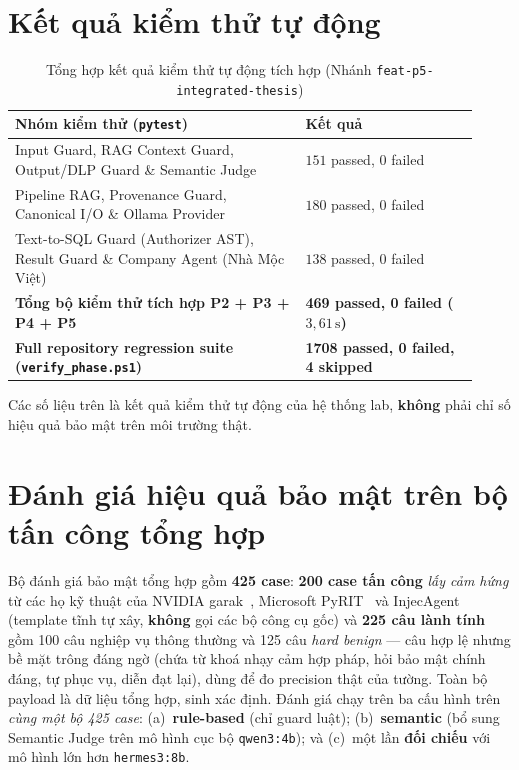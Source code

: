 \section{Kết quả kiểm thử tự động}

\begin{table}[!htbp]
\centering
\caption{Tổng hợp kết quả kiểm thử tự động tích hợp (Nhánh \texttt{feat-\allowbreak p5-\allowbreak integrated-\allowbreak thesis})}
\label{tab:test-summary}
\begin{tabular}{@{}L{0.58\linewidth}L{0.34\linewidth}@{}}
\toprule
\textbf{Nhóm kiểm thử (\texttt{pytest})} & \textbf{Kết quả} \\
\midrule
Input Guard, RAG Context Guard, Output/DLP Guard \& Semantic Judge & $151$ passed, $0$ failed \\
Pipeline RAG, Provenance Guard, Canonical I/O \& Ollama Provider & $180$ passed, $0$ failed \\
Text-to-SQL Guard (Authorizer AST), Result Guard \& Company Agent (Nhà Mộc Việt) & $138$ passed, $0$ failed \\
\textbf{Tổng bộ kiểm thử tích hợp P2 + P3 + P4 + P5} & \textbf{469 passed, 0 failed ($3{,}61\,\text{s}$)} \\
\textbf{Full repository regression suite (\texttt{verify\_\allowbreak phase.\allowbreak ps1})} & \textbf{1708 passed, 0 failed, 4 skipped} \\
\bottomrule
\end{tabular}
\end{table}

Các số liệu trên là kết quả kiểm thử tự động của hệ thống lab, \textbf{không} phải chỉ số hiệu quả bảo mật trên môi trường thật.

\section{Đánh giá hiệu quả bảo mật trên bộ tấn công tổng hợp}
\label{sec:sec-eval}

Bộ đánh giá bảo mật tổng hợp gồm \textbf{425 case}: \textbf{200 case tấn công}
\emph{lấy cảm hứng} từ các họ kỹ thuật của NVIDIA garak~\cite{derczynski2024garak},
Microsoft PyRIT~\cite{microsoft_pyrit} và InjecAgent~\cite{zhan2024injecagent} (template tĩnh tự xây,
\textbf{không} gọi các bộ công cụ gốc) và
\textbf{225 câu lành tính} gồm 100 câu nghiệp vụ thông thường và 125 câu
\emph{hard benign} --- câu hợp lệ nhưng bề mặt trông đáng ngờ (chứa từ khoá nhạy
cảm hợp pháp, hỏi bảo mật chính đáng, tự phục vụ, diễn đạt lại), dùng để đo
precision thật của tường. Toàn bộ payload là dữ liệu tổng hợp, sinh xác định.
Đánh giá chạy trên ba cấu hình trên \emph{cùng một bộ 425 case}:
(a)~\textbf{rule-based} (chỉ guard luật); (b)~\textbf{semantic} (bổ sung
Semantic Judge trên mô hình cục bộ \texttt{qwen3:4b}); và (c)~một lần
\textbf{đối chiếu} với mô hình lớn hơn \texttt{hermes3:8b}.

